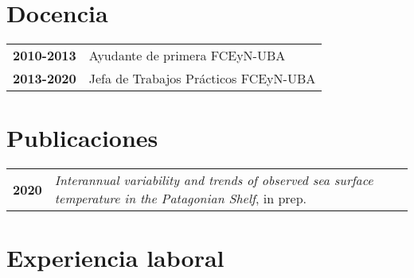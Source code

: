 \documentclass[pastel]{hipstercv}
\begin{document}
\begin{paracol}{2}
\begin{minipage}[t]{0.17\textwidth}
 \hspace{2em}
\end{minipage}

\vspace{2em}

\begin{minipage}[t]{0.3\textwidth}
\section*{Docencia}
\begin{tabular}{>{\footnotesize\bfseries}r >{\footnotesize}p{}}
    2010-2013 & Ayudante de primera FCEyN-UBA \\
    2013-2020 & Jefa de Trabajos Pr\'acticos FCEyN-UBA 
\end{tabular}
\end{minipage}\hfill
\begin{minipage}[t]{0.3\textwidth}
\section*{Publicaciones}
\begin{tabular}{>{\footnotesize\bfseries}r >{\footnotesize}p{}}
    2020 & \emph{Interannual variability and trends of observed sea surface temperature in the Patagonian Shelf}, in prep. \\
\end{tabular}
\end{minipage}



\section*{Experiencia laboral}



\end{paracol}
\end{document}
